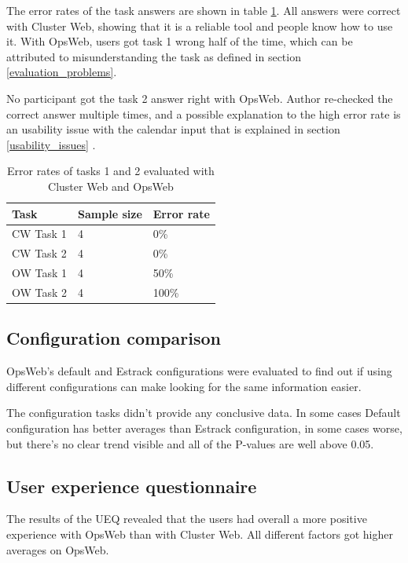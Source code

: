 The error rates of the task answers are shown in table \ref{cw_ow_errors}. All answers were correct with Cluster Web, showing that it is a reliable tool and people know how to use it. With OpsWeb, users got task 1 wrong half of the time, which can be attributed to misunderstanding the task as defined in section \ref{evaluation_problems}. 

No participant got the task 2 answer right with OpsWeb. Author re-checked the correct answer multiple times, and a possible explanation to the high error rate is an usability issue with the calendar input that is explained in section \ref{usability_issues} .

\begin{table}[!ht]
\def\arraystretch{1.1}%
    \begin{center}
    \caption{Error rates of tasks 1 and 2 evaluated with Cluster Web and OpsWeb}
    \label{cw_ow_errors}
    \begin{tabular}{| l | l | l | }
    \hline
    Task & Sample size & Error rate  \\
    \hline
    CW Task 1    &  4 & 0\%       \\
    CW Task 2    &  4 & 0\%       \\
    OW Task 1    &  4 & 50\%       \\
    OW Task 2    &  4 & 100\%       \\
    \hline
    \end{tabular}
    \end{center}
\end{table}

\subsection{Configuration comparison}
OpsWeb's default and Estrack configurations were evaluated to find out if using different configurations can make looking for the same information easier.

The configuration tasks didn't provide any conclusive data. In some cases Default configuration has better averages than Estrack configuration, in some cases worse, but there's no clear trend visible and all of the P-values are well above 0.05.

\subsection{User experience questionnaire}
The results of the UEQ revealed that the users had overall a more positive experience with OpsWeb than with Cluster Web. All different factors got higher averages on OpsWeb.

